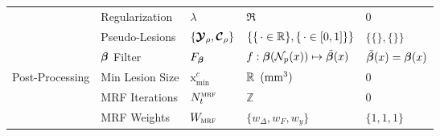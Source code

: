 \begin{table}
\begin{tabular}{lllll}
  	                                 & Regularization       & $\lambda$                   & $\Re$                                             & $0$                       \\
  	                                 & Pseudo-Lesions       & $\{\bm{\mathcal{Y}}_{\rho},\bm{\mathcal{C}}_{\rho}\}$ & $\{\{\thinspace\cdot\in\mathbb{R}\},\{\thinspace\cdot\in[0,1]\}\}$     & $\{\{\},\{\}\}$           \\
  	                                 & $\bm{\beta}$ Filter         & $F_{\bm{\beta}}$                   & $f: \bm{\beta}(\mathcal{N}_p(x)) \mapsto \tilde{\bm{\beta}}(x)$ & $\tilde{\bm{\beta}}(x) = \bm{\beta}(x)$ \\ \hline
  	\multirow{3}{*}{Post-Processing} & Min Lesion  Size     & $\mathrm{x}_{\min}^{c}$     & $\mathbb{R}\enspace(\text{mm}^{3})$                           & $0$                       \\
  	                                 & MRF Iterations       & $N_{t}^{\textsc{mrf}}$              & $\mathbb{Z}$                                      & $0$                       \\
  	                                 & MRF Weights          & $W_{\textsc{mrf}}$                  & $\{w_{\Delta},w_{F},w_y\}$                        & $\{1,1,1\}$               \\ \hline
  \end{tabular}
\end{table}
